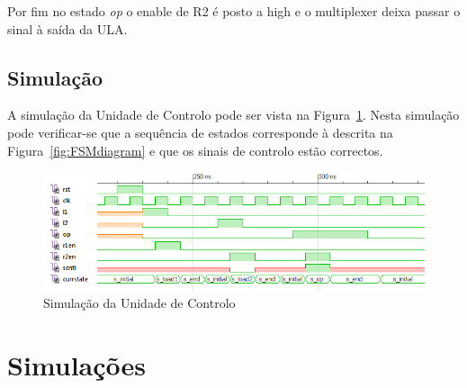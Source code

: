\documentclass[a4paper]{article}
\begin{document}
Por fim no estado \textit{op} o enable de R2 é posto a high e o multiplexer deixa passar o sinal à saída da ULA.

\subsection{Simulação}
A simulação da Unidade de Controlo pode ser vista na Figura~\ref{fig:controlo_sim}. Nesta simulação pode verificar-se que a sequência de estados corresponde à descrita na Figura~\ref{fig:FSMdiagram} e que os sinais de controlo estão correctos.

\begin{figure}[H]
	\centering
	\includegraphics[width=\textwidth]{control_sim}
	\caption{Simulação da Unidade de Controlo}
	\label{fig:controlo_sim}
\end{figure}

\pagebreak


\section{Simulações}
\end{document}
